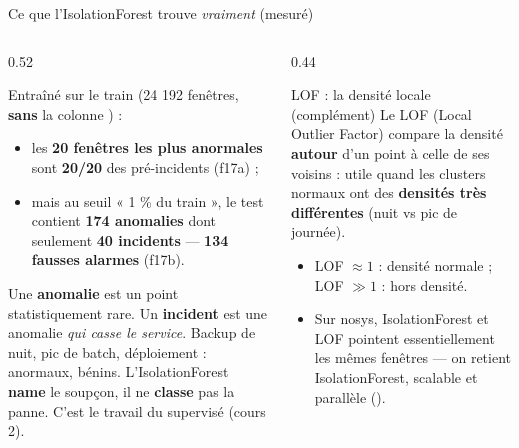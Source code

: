 \begin{frame}{Ce que l'IsolationForest trouve \emph{vraiment} (mesuré)}
\footnotesize%
\begin{columns}[t]
\begin{column}{0.52\textwidth}
\begin{ebox}
Entraîné sur le train (24 192 fenêtres, \textbf{sans} la colonne
) :
\begin{itemize}
\item les \textbf{20 fenêtres les plus anormales} sont
\textbf{20/20} des pré-incidents (f17a) ;
\item mais au seuil « 1 \% du train », le test contient
\textbf{174 anomalies} dont seulement \textbf{40 incidents}
--- \textbf{134 fausses alarmes} (f17b).
\end{itemize}
\end{ebox}
\begin{wbox}
Une \textbf{anomalie} est un point statistiquement rare. Un
\textbf{incident} est une anomalie \emph{qui casse le service}.
Backup de nuit, pic de batch, déploiement : anormaux, bénins.
L'IsolationForest \textbf{name} le soupçon, il ne \textbf{classe} pas
la panne. C'est le travail du supervisé (cours 2).
\end{wbox}
\end{column}
\begin{column}{0.44\textwidth}
\begin{block}{LOF : la densité locale (complément)}
Le LOF (Local Outlier Factor) compare la densité \textbf{autour} d'un
point à celle de ses voisins : utile quand les clusters normaux ont des
\textbf{densités très différentes} (nuit vs pic de journée).
\begin{itemize}
\item LOF $\approx 1$ : densité normale ; LOF $\gg 1$ : hors densité.
\item Sur nosys, IsolationForest et LOF pointent essentiellement les
mêmes fenêtres --- on retient IsolationForest, scalable et parallèle
().
\end{itemize}
\end{block}
\end{column}
\end{columns}
\end{frame}

